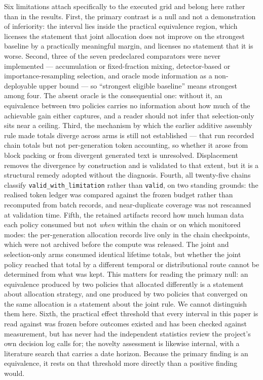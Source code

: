 Six limitations attach specifically to the executed grid and belong here rather than in the results. First, the primary contrast is a null and not a demonstration of inferiority: the interval lies inside the practical equivalence region, which licenses the statement that joint allocation does not improve on the strongest baseline by a practically meaningful margin, and licenses no statement that it is worse. Second, three of the seven predeclared comparators were never implemented --- accumulation or fixed-fraction mixing, detector-based or importance-resampling selection, and oracle mode information as a non-deployable upper bound --- so ``strongest eligible baseline'' means strongest among four. The absent oracle is the consequential one: without it, an equivalence between two policies carries no information about how much of the achievable gain either captures, and a reader should not infer that selection-only sits near a ceiling. Third, the mechanism by which the earlier additive assembly rule made totals diverge across arms is still not established --- that run recorded chain totals but not per-generation token accounting, so whether it arose from block packing or from divergent generated text is unresolved. Displacement removes the divergence by construction and is validated to that extent, but it is a structural remedy adopted without the diagnosis. Fourth, all twenty-five chains classify \texttt{valid\_with\_limitation} rather than \texttt{valid}, on two standing grounds: the realised token ledger was compared against the frozen budget rather than recomputed from batch records, and near-duplicate coverage was not rescanned at validation time. Fifth, the retained artifacts record how much human data each policy consumed but not \emph{when} within the chain or on which monitored modes: the per-generation allocation records live only in the chain checkpoints, which were not archived before the compute was released. The joint and selection-only arms consumed identical lifetime totals, but whether the joint policy reached that total by a different temporal or distributional route cannot be determined from what was kept. This matters for reading the primary null: an equivalence produced by two policies that allocated differently is a statement about allocation strategy, and one produced by two policies that converged on the same allocation is a statement about the joint rule. We cannot distinguish them here. Sixth, the practical effect threshold that every interval in this paper is read against was frozen before outcomes existed and has been checked against measurement, but has never had the independent statistics review the project's own decision log calls for; the novelty assessment is likewise internal, with a literature search that carries a date horizon. Because the primary finding is an equivalence, it rests on that threshold more directly than a positive finding would.

